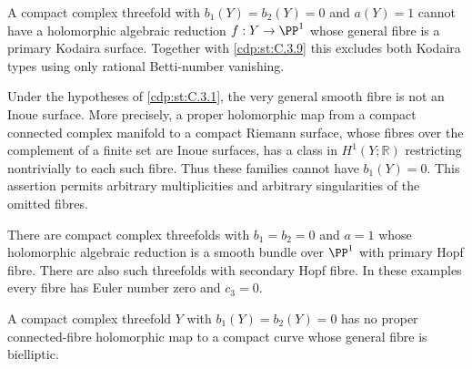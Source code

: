 \begin{proposition}\hypertarget{tag-01F5}{}\label{cdp:st:C.3.10}



A compact complex threefold with $b_1(Y)=b_2(Y)=0$ and
$a(Y)=1$ cannot have a holomorphic algebraic reduction
$f:Y\to\PP^1$ whose general fibre is a primary Kodaira
surface. Together with \ref{cdp:st:C.3.9} this excludes both Kodaira
types using only rational Betti-number vanishing.
\end{proposition}

\begin{proposition}\hypertarget{tag-01F7}{}\label{cdp:st:C.3.12}



Under the hypotheses of \ref{cdp:st:C.3.1}, the very general smooth fibre is
not an Inoue surface. More precisely, a proper holomorphic map from
a compact connected complex manifold to a compact Riemann surface,
whose fibres over the complement of a finite set are Inoue surfaces,
has a class in $H^1(Y;\mathbb R)$ restricting nontrivially to each
such fibre. Thus these families cannot have $b_1(Y)=0$.
This assertion permits arbitrary multiplicities and arbitrary
singularities of the omitted fibres.
\end{proposition}

\begin{proposition}\hypertarget{tag-01FC}{}\label{cdp:st:C.3.6}



There are compact complex threefolds with $b_1=b_2=0$ and $a=1$
whose holomorphic algebraic reduction is a smooth bundle over
$\PP^1$ with primary Hopf fibre. There are also such threefolds
with secondary Hopf fibre. In these examples every fibre has Euler
number zero and $c_3=0$.
\end{proposition}

\begin{proposition}\hypertarget{tag-01FD}{}\label{cdp:st:C.3.7}



A compact complex threefold $Y$ with $b_1(Y)=b_2(Y)=0$ has no
proper connected-fibre holomorphic map to a compact curve whose
general fibre is bielliptic.
\end{proposition}

